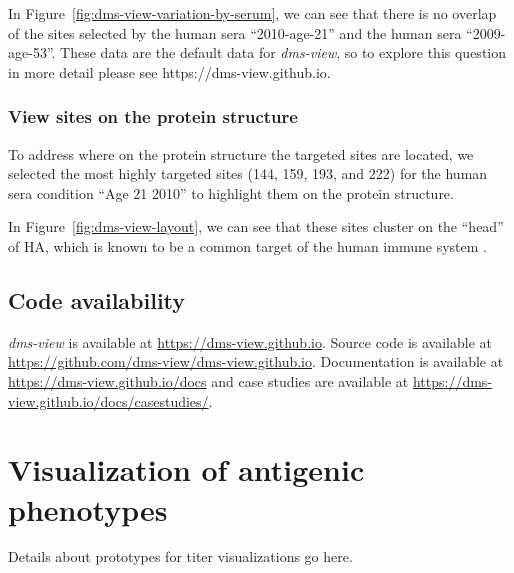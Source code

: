 In Figure~\ref{fig:dms-view-variation-by-serum}, we can see that there is no overlap of the sites selected by the human sera ``2010-age-21'' and the human sera ``2009-age-53''.
These data are the default data for \emph{dms-view}, so to explore this question in more detail please see https://dms-view.github.io.

\subsubsection{View sites on the protein structure}

To address where on the protein structure the targeted sites are located, we selected the most highly targeted sites (144, 159, 193, and 222) for the human sera condition ``Age 21 2010'' to highlight them on the protein structure.

In Figure~\ref{fig:dms-view-layout}, we can see that these sites cluster on the ``head'' of HA, which is known to be a common target of the human immune system \citep{Chambers:2015jt}.

\subsection{Code availability}

\emph{dms-view} is available at \url{https://dms-view.github.io}.
Source code is available at \url{https://github.com/dms-view/dms-view.github.io}.
Documentation is available at \url{https://dms-view.github.io/docs} and case studies are available at \url{https://dms-view.github.io/docs/casestudies/}.

\section{Visualization of antigenic phenotypes}

Details about prototypes for titer visualizations go here.
